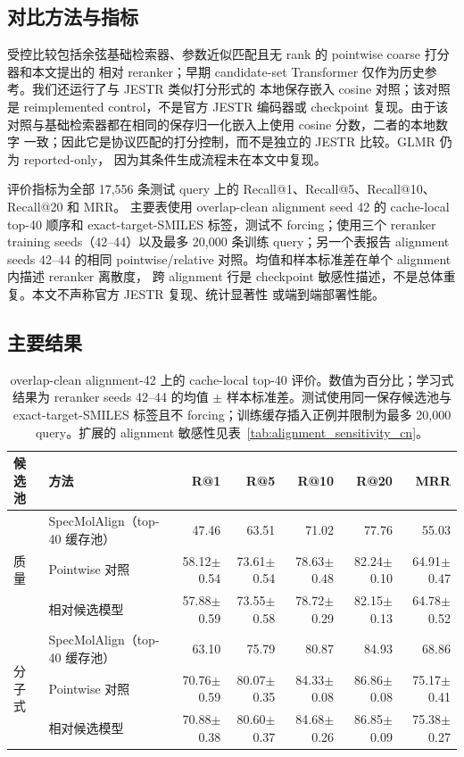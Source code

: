 \documentclass[UTF8,11pt]{ctexart}
\newcommand{\base}{SpecMolAlign}
\begin{document}
\subsection{对比方法与指标}

受控比较包括余弦基础检索器、参数近似匹配且无 rank 的 pointwise coarse 打分器和本文提出的
相对 reranker；早期 candidate-set Transformer 仅作为历史参考。我们还运行了与 JESTR 类似打分形式的
本地保存嵌入 cosine 对照；该对照是 reimplemented control，不是官方 JESTR 编码器或 checkpoint
复现。由于该对照与基础检索器都在相同的保存归一化嵌入上使用 cosine 分数，二者的本地数字
一致；因此它是协议匹配的打分控制，而不是独立的 JESTR 比较。GLMR 仍为 reported-only，
因为其条件生成流程未在本文中复现。

评价指标为全部 17,556 条测试 query 上的 Recall@1、Recall@5、Recall@10、Recall@20 和 MRR。
主要表使用 overlap-clean alignment seed 42 的 cache-local top-40 顺序和 exact-target-SMILES
标签，测试不 forcing；使用三个 reranker
training seeds（42--44）以及最多 20,000 条训练 query；另一个表报告 alignment seeds 42--44
的相同 pointwise/relative 对照。均值和样本标准差在单个 alignment 内描述 reranker 离散度，
跨 alignment 行是 checkpoint 敏感性描述，不是总体重复。本文不声称官方 JESTR 复现、统计显著性
或端到端部署性能。

\subsection{主要结果}

\begin{table}[t]
  \centering
  \caption{overlap-clean alignment-42 上的 cache-local top-40 评价。数值为百分比；学习式
  结果为 reranker seeds 42--44 的均值 $\pm$ 样本标准差。测试使用同一保存候选池与
  exact-target-SMILES 标签且不 forcing；训练缓存插入正例并限制为最多 20,000 query。扩展的
  alignment 敏感性见表~\ref{tab:alignment_sensitivity_cn}。}
  \label{tab:main_results_cn}
  \scriptsize
  \setlength{\tabcolsep}{2pt}
    \begin{tabular}{llrrrrr}
    \toprule
    候选池 & 方法 & R@1 & R@5 & R@10 & R@20 & MRR \\
    \midrule
    \multirow{3}{*}{质量}
      & \base{}（top-40 缓存池） & 47.46 & 63.51 & 71.02 & 77.76 & 55.03 \\
      & Pointwise 对照
      & 58.12$\pm$0.54 & 73.61$\pm$0.54 & 78.63$\pm$0.48 & 82.24$\pm$0.10 & 64.91$\pm$0.47 \\
      & 相对候选模型
      & 57.88$\pm$0.59 & 73.55$\pm$0.58 & 78.72$\pm$0.29 & 82.15$\pm$0.13 & 64.78$\pm$0.52 \\
    \midrule
    \multirow{3}{*}{分子式}
      & \base{}（top-40 缓存池） & 63.10 & 75.79 & 80.87 & 84.93 & 68.86 \\
      & Pointwise 对照
      & 70.76$\pm$0.59 & 80.07$\pm$0.35 & 84.33$\pm$0.08 & 86.86$\pm$0.08 & 75.17$\pm$0.41 \\
      & 相对候选模型
      & 70.88$\pm$0.38 & 80.60$\pm$0.37 & 84.68$\pm$0.26 & 86.85$\pm$0.09 & 75.38$\pm$0.27 \\
    \bottomrule
  \end{tabular}
\end{table}
\end{document}
